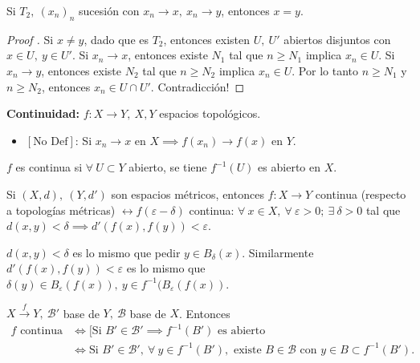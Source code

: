 \begin{lemma}
	Si $T_2,\ (x_n)_n$ sucesión con $x_n \to x,\ x_n \to y$, entonces $x = y$.
\end{lemma}

\begin{proof}[Proof ]
	Si $x \neq y$, dado que es $T_2$, entonces existen $U,\ U'$ abiertos disjuntos con $x \in U,\ y \in U'$. Si $x_n \to x$, entonces existe $N_1$ tal que $n \geq N_1$ implica $x_n \in U$. Si $x_n \to y$, entonces existe $N_2$ tal que $n\geq N_2$ implica $x_n \in U$. Por lo tanto $n \geq N_1$ y $n \geq N_2$, entonces $x_n \in U \cap U'$. Contradicción! \textreferencemark
\end{proof}

\noindent \textbf{Continuidad: } $f: X \to Y,\ X,Y$ espacios topológicos.
\begin{itemize}
	\item $[\text{No Def}]$: Si $x_n \to x$ en $X \implies f(x_n) \to f(x)$ en $Y$.
\end{itemize}
\begin{definition}[continuidad]
	$f$ es continua si $\forall \ U \subset Y$ abierto, se tiene $f^{-1} (U)$ es abierto en $X$.
\end{definition}

\begin{eg}
	Si $(X,d),\ (Y,d')$ son espacios métricos, entonces $f:X \to Y$ continua (respecto a topologías métricas) $\longleftrightarrow f(\varepsilon - \delta)$ continua: $\forall\ x \in X,\ \forall \ \varepsilon > 0;\ \exists \ \delta > 0$ tal que $d(x,y) < \delta \implies d'(f(x),f(y)) < \varepsilon$.
\end{eg}
\begin{remark}
	$d(x,y)<\delta$ es lo mismo que pedir $y \in B_{\delta}(x)$. Similarmente $d'(f(x),f(y))<\varepsilon$ es lo mismo que $\delta (y) \in B_{\varepsilon}(f(x)), \ y \in f^{-1}(B_{\varepsilon}(f(x))$.
\end{remark}

\begin{lemma}
	$X \xrightarrow{f} Y,\ \mathcal{B}'$ base de $Y, \ \mathcal{B}$ base de $X$. Entonces
	\begin{align*}
		f \text{ continua} & \iff [\text{Si } B' \in \mathcal{B}' \implies f^{-1}(B') \text{ es abierto} \\
		& \iff \text{Si } B' \in \mathcal{B}',\ \forall\ y \in f^{-1}(B'), \text{ existe } B \in \mathcal{B} \text{ con } y \in B \subset f^{-1}(B')
	.\end{align*}
\end{lemma}


